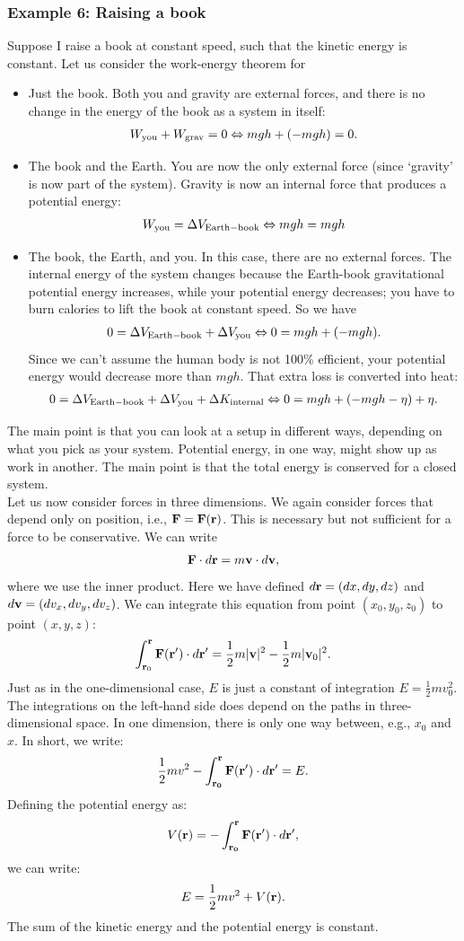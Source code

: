 \documentclass[12pt]{article}
\newcommand{\be}{\begin{eqnarray}}
\newcommand{\ee}{\end{eqnarray}}
\begin{document}
\subsubsection*{Example 6: Raising a book}
Suppose I raise a book at constant speed, such that the kinetic energy is constant. Let us consider the work-energy theorem for 
\begin{itemize}
\item Just the book. Both you and gravity are external forces, and there is no change in the energy of the book as a system in itself:
\be
W_{\rm you} + W_{\rm grav} = 0 \Leftrightarrow mgh + (-mgh) = 0.
\ee
\item The book and the Earth. You are now the only external force (since `gravity' is now part of the system). Gravity is now an internal force that produces a potential energy:
\be
W_{\rm you} = \Delta V_{\rm Earth-book} \Leftrightarrow mgh = mgh
\ee
\item The book, the Earth, and you. In this case, there are no external forces. The internal energy of the system changes because the Earth-book gravitational potential energy increases, while your potential energy decreases; you have to burn calories to lift the book at constant speed. So we have
\be
0 = \Delta V_{\rm Earth-book} + \Delta V_{\rm you} \Leftrightarrow 0= mgh + (-mgh). 
\ee
Since we can't assume the human body is not 100\% efficient, your potential energy would decrease more than $mgh$. That extra loss is converted into heat:
\be
0 = \Delta V_{\rm Earth-book} + \Delta V_{\rm you} +\Delta K_{\rm internal} \Leftrightarrow 0= mgh + (-mgh - \eta) + \eta.
\ee
\end{itemize}
The main point is that you can look at a setup in different ways, depending on what you pick as your system. Potential energy, in one way, might show up as work in another. The main point is that the total energy is conserved for a closed system.\\ 

\noindent
Let us now consider forces in three dimensions. We again consider forces that depend only on position, i.e., ${\bf F }={\bf F }({\bf r})$. This is necessary but not sufficient for a force to be conservative. We can write
\be
{\bf F} \cdot d{\bf r} = m {\bf v}\cdot d {\bf v},
\ee
where we use the inner product. Here we have defined $d{\bf r} = (dx, dy ,dz)$ and $d{\bf v} = (dv_x, dv_y, dv_z)$. We can integrate this equation from point $(x_0, y_0, z_0)$ to point $(x,y,z)$:
\be
\int_{{\bf r}_0}^{\bf r} {\bf F}({\bf r'}) \cdot d{\bf r'} = \frac{1}{2}m|{\bf v}|^2-\frac{1}{2}m|{\bf v}_0|^2. 
\ee
Just as in the one-dimensional case, $E$ is just a constant of integration $E = \frac{1}{2} m v_0^2$. The integrations on the left-hand side does depend on the paths in three-dimensional space. In one dimension, there is only one way between, e.g., $x_0$ and $x$. In short, we write:
\be
\frac{1}{2}m v^2-\int_{\bf r_0}^{\bf r} {\bf F}({\bf r'}) \cdot d{\bf r'} = E. 
\ee
Defining the potential energy as:
\be
V({\bf r}) = -\int_{\bf r_0}^{\bf r} {\bf F}({\bf r'}) \cdot d{\bf r'},
\ee
we can write:
\be
E = \frac{1}{2} mv^2 + V({\bf r}).
\ee
The sum of the kinetic energy and the potential energy is constant. 
\end{document}
